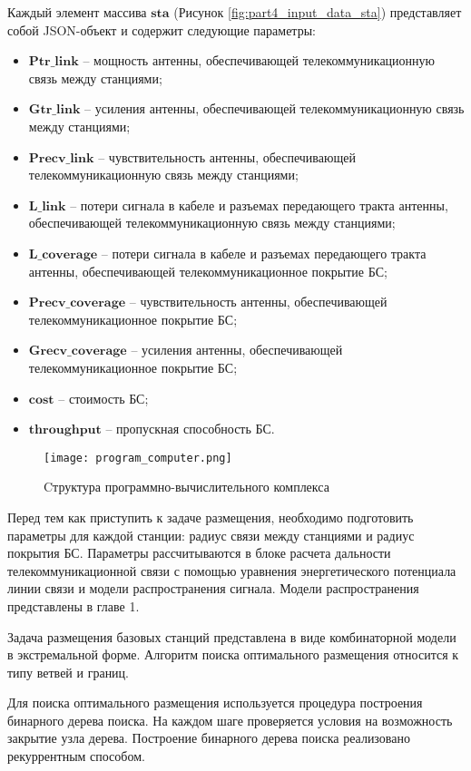Каждый элемент массива $\textbf{sta}$ (Рисунок \cref{fig:part4_input_data_sta}) представляет собой JSON-объект и содержит следующие параметры:
\begin{itemize}
  \item $\textbf{Ptr\_link}$ -- мощность антенны, обеспечивающей телекоммуникационную связь между станциями;
  \item $\textbf{Gtr\_link}$ -- усиления антенны, обеспечивающей телекоммуникационную связь между станциями;
  \item $\textbf{Precv\_link}$ -- чувствительность антенны, обеспечивающей телекоммуникационную связь между станциями;
  \item $\textbf{L\_link}$ -- потери сигнала в кабеле и разъемах передающего тракта антенны, обеспечивающей телекоммуникационную связь между станциями;
  \item $\textbf{L\_coverage}$ -- потери сигнала в кабеле и разъемах передающего тракта антенны, обеспечивающей телекоммуникационное покрытие БС;
  \item $\textbf{Precv\_coverage}$ -- чувствительность антенны, обеспечивающей телекоммуникационное покрытие БС;
  \item $\textbf{Grecv\_coverage}$ -- усиления антенны, обеспечивающей телекоммуникационное покрытие БС;
  \item $\textbf{cost}$ -- стоимость БС;
  \item $\textbf{throughput}$ -- пропускная способность БС.
\end{itemize}



\begin{figure}[h!]
  \centering
   \texttt{[image: program\_computer.png]}
\caption{Cтруктура программно-вычислительного комплекса}
\label{fig:part4_program_computer}
\end{figure}

Перед тем как приступить к задаче размещения, необходимо подготовить параметры для каждой станции: радиус связи между станциями и радиус покрытия БС. Параметры рассчитываются в блоке расчета дальности телекоммуникационной связи с помощью уравнения энергетического потенциала линии связи и модели распространения сигнала. Модели распространения представлены в главе 1.


Задача размещения базовых станций представлена в виде комбинаторной модели в экстремальной форме. Алгоритм поиска оптимального размещения относится к типу ветвей и границ. 

Для поиска оптимального размещения используется процедура построения бинарного дерева поиска. На каждом шаге проверяется условия на возможность закрытие узла дерева. Построение бинарного дерева поиска реализовано рекуррентным способом.

